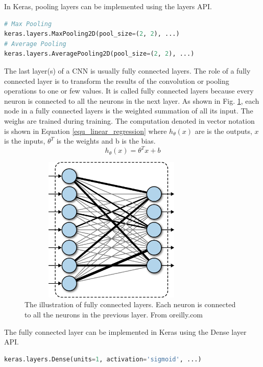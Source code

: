 In Keras, pooling layers can be implemented using the layers API.
\begin{lstlisting}[language=python,frame=single]
# Max Pooling
keras.layers.MaxPooling2D(pool_size=(2, 2), ...)
# Average Pooling
keras.layers.AveragePooling2D(pool_size=(2, 2), ...)
\end{lstlisting}

The last layer(s) of a CNN is usually fully connected layers. The role of a fully connected layer is to transform the results of the convolution or pooling operations to one or few values. It is called fully connected layers because every neuron is connected to all the neurons in the next layer. As shown in Fig. \ref{fig_fc}, each node in a fully connected layers is the weighted summation of all its input. The weighs are trained during training. The computation denoted in vector notation is shown in Equation \ref{equ_linear_regression} where $h_\theta(x)$ are is the outputs, $x$ is the inputs, $\theta^T$ is the weights and b is the bias. 
\begin{equation}
h_\theta(x)=\theta^Tx + b \label{equ_linear_regression}
\end{equation}
\begin{figure}[h!]
\begin{center}
\includegraphics[height=7cm, width = 9cm]{img/fully_connected.png}
\caption[The illustration of fully connected layers]{The illustration of fully connected layers. Each neuron is connected to all the neurons in the previous layer. From oreilly.com \label{fig_fc}}
\end{center}
\end{figure}

The fully connected layer can be implemented in Keras using the Dense layer API.
\begin{lstlisting}[language=python,frame=single]
keras.layers.Dense(units=1, activation='sigmoid', ...)
\end{lstlisting}
